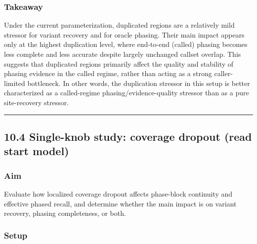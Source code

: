 \documentclass[
]{article}
\begin{document}
\subsubsection{Takeaway}\label{takeaway-1}

Under the current parameterization, duplicated regions are a relatively
mild stressor for variant recovery and for oracle phasing. Their main
impact appears only at the highest duplication level, where end-to-end
(called) phasing becomes less complete and less accurate despite largely
unchanged callset overlap. This suggests that duplicated regions
primarily affect the quality and stability of phasing evidence in the
called regime, rather than acting as a strong caller-limited bottleneck.
In other words, the duplication stressor in this setup is better
characterized as a called-regime phasing/evidence-quality stressor than
as a pure site-recovery stressor.

\begin{center}\rule{0.5\linewidth}{0.5pt}\end{center}

\subsection{10.4 Single-knob study: coverage dropout (read start
model)}\label{single-knob-study-coverage-dropout-read-start-model}

\subsubsection{Aim}\label{aim-2}

Evaluate how localized coverage dropout affects phase-block continuity
and effective phased recall, and determine whether the main impact is on
variant recovery, phasing completeness, or both.

\subsubsection{Setup}\label{setup-2}
\end{document}
